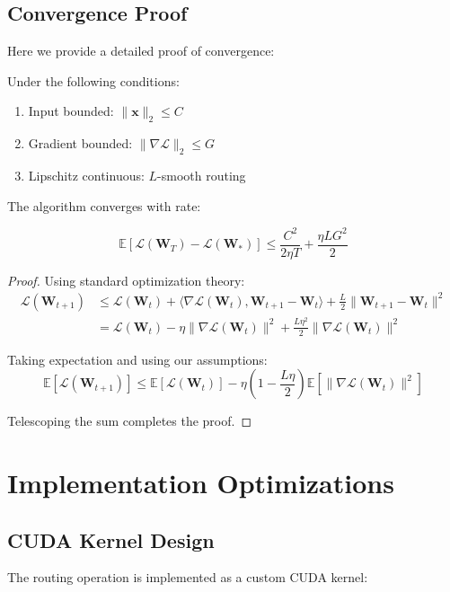 \documentclass[10pt]{article}
\begin{document}
\subsection{Convergence Proof}
Here we provide a detailed proof of convergence:

\begin{theorem}
Under the following conditions:
\begin{enumerate}
    \item Input bounded: $\|\mathbf{x}\|_2 \leq C$
    \item Gradient bounded: $\|\nabla \mathcal{L}\|_2 \leq G$
    \item Lipschitz continuous: $L$-smooth routing
\end{enumerate}

The algorithm converges with rate:

\begin{equation}
    \mathbb{E}[\mathcal{L}(\mathbf{W}_T) - \mathcal{L}(\mathbf{W}_*)] \leq \frac{C^2}{2\eta T} + \frac{\eta L G^2}{2}
\end{equation}
\end{theorem}

\begin{proof}
Using standard optimization theory:
\begin{align}
    \mathcal{L}(\mathbf{W}_{t+1}) &\leq \mathcal{L}(\mathbf{W}_t) + \langle\nabla \mathcal{L}(\mathbf{W}_t), \mathbf{W}_{t+1} - \mathbf{W}_t\rangle + \frac{L}{2}\|\mathbf{W}_{t+1} - \mathbf{W}_t\|^2 \\
    &= \mathcal{L}(\mathbf{W}_t) - \eta\|\nabla \mathcal{L}(\mathbf{W}_t)\|^2 + \frac{L\eta^2}{2}\|\nabla \mathcal{L}(\mathbf{W}_t)\|^2
\end{align}

Taking expectation and using our assumptions:
\begin{equation}
    \mathbb{E}[\mathcal{L}(\mathbf{W}_{t+1})] \leq \mathbb{E}[\mathcal{L}(\mathbf{W}_t)] - \eta(1 - \frac{L\eta}{2})\mathbb{E}[\|\nabla \mathcal{L}(\mathbf{W}_t)\|^2]
\end{equation}

Telescoping the sum completes the proof.
\end{proof}

\section{Implementation Optimizations}

\subsection{CUDA Kernel Design}
The routing operation is implemented as a custom CUDA kernel:
\end{document}
